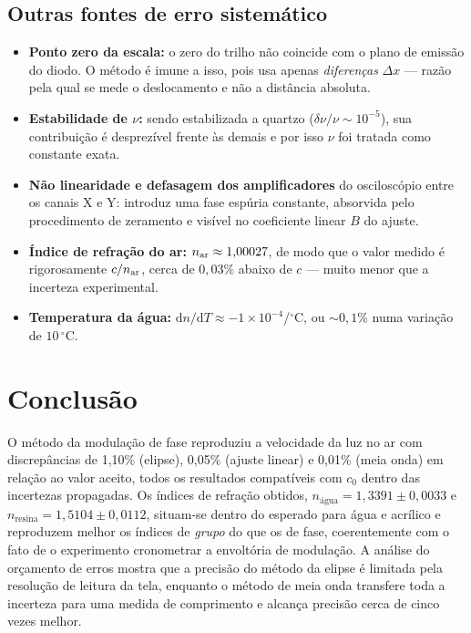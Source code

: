 \documentclass[11pt,a4paper]{article}
\begin{document}
\subsection{Outras fontes de erro sistemático}
\begin{itemize}\setlength\itemsep{1pt}
\item \textbf{Ponto zero da escala:} o zero do trilho não coincide com o plano
      de emissão do diodo. O método é imune a isso, pois usa apenas
      \emph{diferenças} $\Delta x$ --- razão pela qual se mede o deslocamento e
      não a distância absoluta.
\item \textbf{Estabilidade de $\nu$:} sendo estabilizada a quartzo
      ($\delta\nu/\nu \sim 10^{-5}$), sua contribuição é desprezível frente às
      demais e por isso $\nu$ foi tratada como constante exata.
\item \textbf{Não linearidade e defasagem dos amplificadores} do osciloscópio
      entre os canais X e Y: introduz uma fase espúria constante, absorvida
      pelo procedimento de zeramento e visível no coeficiente linear $B$ do
      ajuste.
\item \textbf{Índice de refração do ar:} $n_{\rm ar} \approx 1{,}00027$, de modo
      que o valor medido é rigorosamente $c/n_{\rm ar}$, cerca de
      $0{,}03$\% abaixo de $c$ --- muito menor que a incerteza experimental.
\item \textbf{Temperatura da água:} $\mathrm{d}n/\mathrm{d}T \approx
      -1\times10^{-4}$/$^\circ$C, ou $\sim0{,}1$\% numa variação de
      $10\,^\circ$C.
\end{itemize}

\section{Conclusão}
O método da modulação de fase reproduziu a velocidade da luz no ar com
discrepâncias de 1{,}10\% (elipse), 0{,}05\% (ajuste linear) e
0{,}01\% (meia onda) em relação ao valor aceito, todos os resultados
compatíveis com $c_0$ dentro das incertezas propagadas. Os índices de refração
obtidos, $n_{\text{água}} = 1{,}3391 \pm 0{,}0033$ e
$n_{\text{resina}} = 1{,}5104 \pm 0{,}0112$, situam-se dentro do esperado para
água e acrílico e reproduzem melhor os índices de \emph{grupo} do que os de
fase, coerentemente com o fato de o experimento cronometrar a envoltória de
modulação. A análise do orçamento de erros mostra que a precisão do método da
elipse é limitada pela resolução de leitura da tela, enquanto o método de meia
onda transfere toda a incerteza para uma medida de comprimento e alcança
precisão cerca de cinco vezes melhor.
\end{document}
